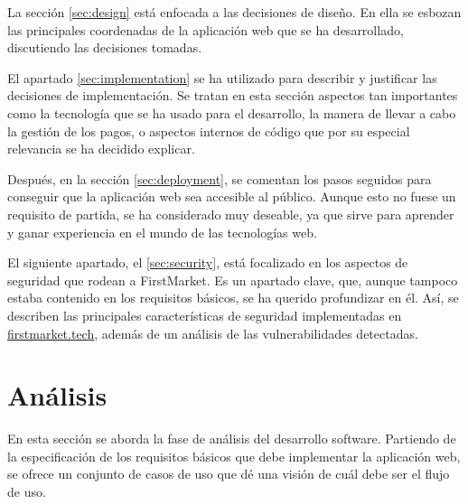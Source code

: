 \documentclass[a4paper]{article}
\begin{document}
    La sección \ref{sec:design} está enfocada a las decisiones de diseño. En ella se esbozan las principales coordenadas de la aplicación web que se ha desarrollado, discutiendo las decisiones tomadas.
    
    El apartado \ref{sec:implementation} se ha utilizado para describir y justificar las decisiones de implementación. Se tratan en esta sección aspectos tan importantes como la tecnología que se ha usado para el desarrollo, la manera de llevar a cabo la gestión de los pagos, o aspectos internos de código que por su especial relevancia se ha decidido explicar.
    
    Después, en la sección \ref{sec:deployment}, se comentan los pasos seguidos para conseguir que la aplicación web sea accesible al público. Aunque esto no fuese un requisito de partida, se ha considerado muy deseable, ya que sirve para aprender y ganar experiencia en el mundo de las tecnologías web.
    
    El siguiente apartado, el \ref{sec:security}, está focalizado en los aspectos de seguridad que rodean a FirstMarket. Es un apartado clave, que, aunque tampoco estaba contenido en los requisitos básicos, se ha querido profundizar en él. Así, se describen las principales características de seguridad implementadas en \href{https://firstmarket.tech}{firstmarket.tech}, además de un análisis de las vulnerabilidades detectadas.
    
    
    \section{Análisis} \label{sec:analysis}
    En esta sección se aborda la fase de análisis del desarrollo software. Partiendo de la especificación de los requisitos básicos que debe implementar la aplicación web, se ofrece un conjunto de casos de uso que dé una visión de cuál debe ser el flujo de uso.
    
\end{document}
